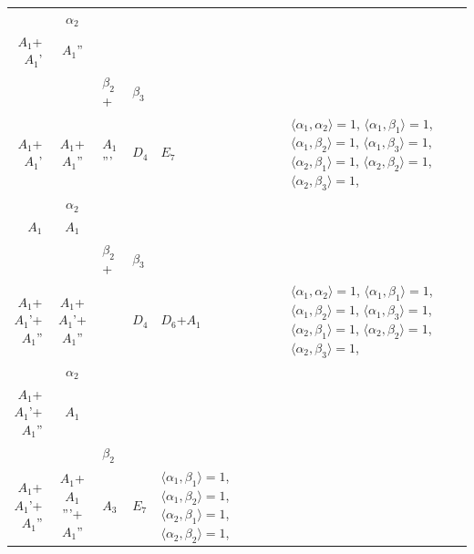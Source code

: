 \documentclass[12pt]{report}
\begin{document}
\begin{appendix}
{\begin{longtable}{rcl p{1cm}p{1cm}p{3cm} }
\\
\begin{tabular}{cc}$\alpha_1$+ & $\alpha_2$\\\tiny{ $A_1$+$A_1$' } & \tiny{ $A_1$'' }\end{tabular} &\begin{tabular}{c} = \\~ \end{tabular} & \begin{tabular}{ccc}$\beta_1$+ & $\beta_2$+ & $\beta_3$\\\tiny{ $A_1$+$A_1$' } & \tiny{ $A_1$+$A_1$'' } & \tiny{ $A_1$''' }\end{tabular} & $D_4$ & $E_7$ & $\langle\alpha_1, \alpha_2\rangle=1$,  $\langle\alpha_1, \beta_1\rangle=1$, $\langle\alpha_1, \beta_2\rangle=1$, $\langle\alpha_1, \beta_3\rangle=1$, $\langle\alpha_2, \beta_1\rangle=1$, $\langle\alpha_2, \beta_2\rangle=1$, $\langle\alpha_2, \beta_3\rangle=1$, 
\\
\begin{tabular}{cc}$\alpha_1$+ & $\alpha_2$\\\tiny{ $A_1$ } & \tiny{ $A_1$ }\end{tabular} &\begin{tabular}{c} = \\~ \end{tabular} & \begin{tabular}{ccc}$\beta_1$+ & $\beta_2$+ & $\beta_3$\\\tiny{ $A_1$+$A_1$'+$A_1$'' } & \tiny{ $A_1$+$A_1$'+$A_1$'' } & \tiny{  }\end{tabular} & $D_4$ & $D_6$+$A_1$ & $\langle\alpha_1, \alpha_2\rangle=1$,  $\langle\alpha_1, \beta_1\rangle=1$, $\langle\alpha_1, \beta_2\rangle=1$, $\langle\alpha_1, \beta_3\rangle=1$, $\langle\alpha_2, \beta_1\rangle=1$, $\langle\alpha_2, \beta_2\rangle=1$, $\langle\alpha_2, \beta_3\rangle=1$, 
\\
\begin{tabular}{cc}$\alpha_1$+ & $\alpha_2$\\\tiny{ $A_1$+$A_1$'+$A_1$'' } & \tiny{ $A_1$ }\end{tabular} &\begin{tabular}{c} = \\~ \end{tabular} & \begin{tabular}{cc}$\beta_1$+ & $\beta_2$\\\tiny{ $A_1$+$A_1$'+$A_1$'' } & \tiny{ $A_1$+$A_1$'''+$A_1$'' }\end{tabular} & $A_3$ & $E_7$ &  $\langle\alpha_1, \beta_1\rangle=1$, $\langle\alpha_1, \beta_2\rangle=1$, $\langle\alpha_2, \beta_1\rangle=1$, $\langle\alpha_2, \beta_2\rangle=1$, 

\end{longtable}}
\end{appendix}
\end{document}
